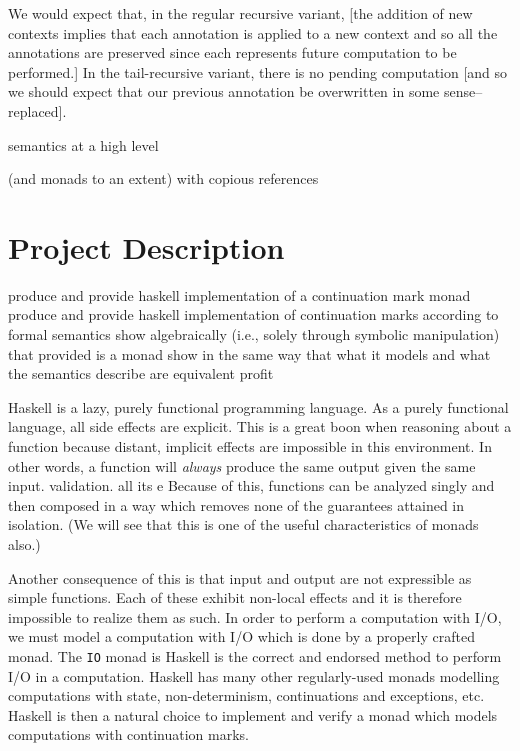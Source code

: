 \documentclass[ms]{byuprop}
\begin{document}
We would expect that, in the regular recursive variant, [the addition of new contexts
implies that each annotation is applied to a new context and so all the annotations are
preserved since each represents future computation to be performed.] In the tail-recursive
variant, there is no pending computation [and so we should expect that our previous
annotation be overwritten in some sense--replaced].


semantics at a high level



(and monads to an extent) with copious references

\section{Project Description}

produce and provide haskell implementation of a continuation mark monad produce and
provide haskell implementation of continuation marks according to formal semantics show
algebraically (i.e., solely through symbolic manipulation) that provided is a monad show
in the same way that what it models and what the semantics describe are equivalent profit

Haskell \cite{hudak1992report} is a lazy, purely functional programming language. As a
purely functional language, all side effects are explicit. This is a great boon when
reasoning about a function because distant, implicit effects are impossible in this
environment. In other words, a function will \emph{always} produce the same output given
the same input. %
validation. all its e Because of this, functions can be analyzed singly and then composed
in a way which removes none of the guarantees attained in isolation. (We will see that
this is one of the useful characteristics of monads also.)

Another consequence of this is that input and output are not expressible as simple
functions. Each of these exhibit non-local effects and it is therefore impossible to
realize them as such. In order to perform a computation with I/O, we must model a
computation with I/O which is done by a properly crafted monad. The \texttt{IO} monad is
Haskell is the correct and endorsed method to perform I/O in a computation. Haskell has
many other regularly-used monads modelling computations with state, non-determinism,
continuations and exceptions, etc. Haskell is then a natural choice to implement and
verify a monad which models computations with continuation marks.
\end{document}
